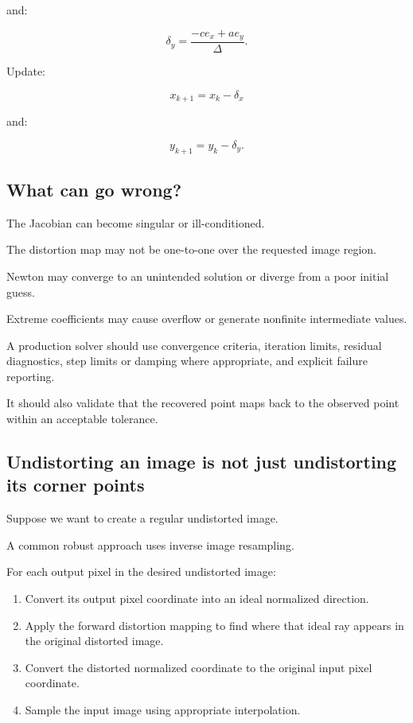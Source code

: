 and:

\[
 \boxed{ \delta_y= \frac{-ce_x+ae_y}{\Delta} }.
\]

Update:

\[
 \boxed{ x_{k+1}=x_k-\delta_x }
\]

and:

\[
 \boxed{ y_{k+1}=y_k-\delta_y }.
\]

\subsection{What can go wrong?}\label{02-foundations-ii-ch035-what-can-go-wrong}

\hypertarget{02-foundations-ii-ch035-what-can-go-wrong}{}

The Jacobian can become singular or ill-conditioned.

The distortion map may not be one-to-one over the requested image region.

Newton may converge to an unintended solution or diverge from a poor initial guess.

Extreme coefficients may cause overflow or generate nonfinite intermediate values.

A production solver should use convergence criteria, iteration limits, residual diagnostics, step limits or damping where appropriate, and explicit failure reporting.

It should also validate that the recovered point maps back to the observed point within an acceptable tolerance.

\subsection{Undistorting an image is not just undistorting its corner points}\label{02-foundations-ii-ch035-undistorting-an-image-is-not-just-undistorting-its-corner-points}

\hypertarget{02-foundations-ii-ch035-undistorting-an-image-is-not-just-undistorting-its-corner-points}{}

Suppose we want to create a regular undistorted image.

A common robust approach uses inverse image resampling.

For each output pixel in the desired undistorted image:

\begin{enumerate}
\def\labelenumi{\arabic{enumi}.}
\tightlist
\item
  Convert its output pixel coordinate into an ideal normalized direction.
\item
  Apply the forward distortion mapping to find where that ideal ray appears in the original distorted image.
\item
  Convert the distorted normalized coordinate to the original input pixel coordinate.
\item
  Sample the input image using appropriate interpolation.
\end{enumerate}

